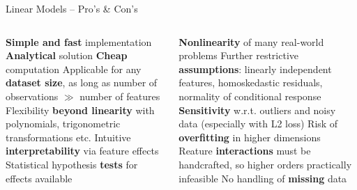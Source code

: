 \begin{frame}{Linear Models -- Pro's \& Con's}



\begin{columns}[onlytextwidth]
  \begin{column}{0.5\textwidth}
    
    \begin{itemize}
      \positem \textbf{Simple and fast} implementation
      \positem \textbf{Analytical} solution
      \positem \textbf{Cheap} computation
      \positem Applicable for any \textbf{dataset size}, as long as number of 
      observations $\gg$ number of features
      \positem Flexibility \textbf{beyond linearity} with polynomials, 
      trigonometric transformations etc.
      \positem Intuitive \textbf{interpretability} via feature effects
      \positem Statistical hypothesis \textbf{tests} for effects available

    \end{itemize}
  \end{column}

  \begin{column}{0.5\textwidth}
    
    \begin{itemize}
      \negitem \textbf{Nonlinearity} of many real-world problems
      \negitem Further restrictive \textbf{assumptions}: linearly independent 
      features, homoskedastic residuals, normality of conditional response
      \negitem \textbf{Sensitivity} w.r.t. outliers and noisy data (especially 
      with L2 loss)
      \negitem Risk of \textbf{overfitting} in higher dimensions
      \negitem Reature \textbf{interactions} must be handcrafted, so higher
      orders practically infeasible
      \negitem No handling of \textbf{missing} data
    \end{itemize}
  \end{column}
\end{columns}

\vfill

\small


\end{frame}

